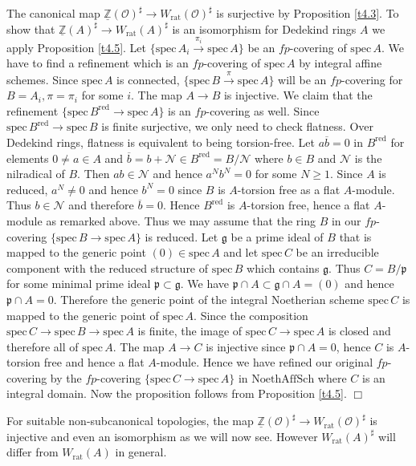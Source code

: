 \documentclass[12pt,leqno]{article}
\newcommand{\Z}{{\mathbb{Z}}}
\newcommand{\uZ}{\underline{\Z}}
\newcommand{\NAS}{\mathrm{NoethAffSch}}
\newcommand{\red}{\mathrm{red}}
\newcommand{\spec}{\mathrm{spec}\,}
\newcommand{\rat}{\mathrm{rat}}
\newcommand{\Nh}{{\mathcal N}}
\newcommand{\Oh}{{\mathcal O}}
\newcommand{\eg}{{\mathfrak{g}}}
\newcommand{\ep}{\mathfrak{p}}
\newcommand{\ob}{\overline{b}}
\newenvironment{proof}{\noindent {\bf Proof}}{\mbox{}\hspace*{\fill}$\Box$}
\begin{document}
\begin{proof}
The canonical map $\uZ (\Oh)^{\sharp} \to W_{\rat} (\Oh)^{\sharp}$ is surjective by Proposition \ref{t4.3}. To show that $\uZ (A)^{\sharp} \to W_{\rat} (A)^{\sharp}$ is an isomorphism for Dedekind rings $A$ we apply Proposition \ref{t4.5}. Let $\{ \spec A_i \xrightarrow{\pi_i} \spec A \}$ be an $fp$-covering of $\spec A$. We have to find a refinement which is an $fp$-covering of $\spec A$ by integral affine schemes. Since $\spec A$ is connected, $\{ \spec B \xrightarrow{\pi} \spec A \}$ will be an $fp$-covering for $B = A_i , \pi = \pi_i$ for some $i$. The map $A \to B$ is injective. We claim that the refinement $\{ \spec B^{\red} \to \spec A \}$ is an $fp$-covering as well. Since $\spec B^{\red} \to \spec B$ is finite surjective, we only need to check flatness. Over Dedekind rings, flatness is equivalent to being torsion-free. Let $a \ob = 0$ in $B^{\red}$ for elements $0 \neq a \in A$ and $\ob = b + \Nh \in B^{\red} = B / \Nh$ where $b \in B$ and $\Nh$ is the nilradical of $B$. Then $ab \in \Nh$ and hence $a^N b^N = 0$ for some $N \ge 1$. Since $A$ is reduced, $a^N \neq 0$ and hence $b^N = 0$ since $B$ is $A$-torsion free as a flat $A$-module. Thus $b \in \Nh$ and therefore $\ob = 0$. Hence $B^{\red}$ is $A$-torsion free, hence a flat $A$-module as remarked above. Thus we may assume that the ring $B$ in our $fp$-covering $\{ \spec B \to \spec A \}$ is reduced. Let $\eg$ be a prime ideal of $B$ that is mapped to the generic point $(0) \in \spec A$ and let $\spec C$ be an irreducible component with the reduced structure of $\spec B$ which contains $\eg$. Thus $C = B / \ep$ for some minimal prime ideal $\ep \subset \eg$. We have $\ep \cap A \subset \eg \cap A = (0)$ and hence $\ep \cap A = 0$. Therefore the generic point of the integral Noetherian scheme $\spec C$ is mapped to the generic point of $\spec A$. Since the composition $\spec C \to \spec B \to \spec A$ is finite, the image of $\spec C \to \spec A$ is closed and therefore all of $\spec A$. The map $A \to C$ is injective since $\ep \cap A = 0$, hence $C$ is $A$-torsion free and hence a flat $A$-module. Hence we have refined our original $fp$-covering by the $fp$-covering $\{ \spec C \to \spec A \}$ in $\NAS$ where $C$ is an integral domain. Now the proposition follows from Proposition \ref{t4.5}.
\end{proof}

For suitable non-subcanonical topologies, the map $\uZ (\Oh)^{\sharp} \to W_{\rat} (\Oh)^{\sharp}$ is injective and even an isomorphism as we will now see. However $W_{\rat} (A)^{\sharp}$ will differ from $W_{\rat} (A)$ in general.
\end{document}
